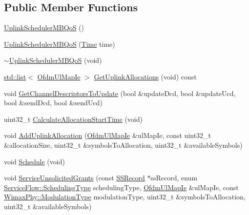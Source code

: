 \subsection*{Public Member Functions}
\begin{DoxyCompactItemize}
\item 
\hyperlink{classns3_1_1UplinkSchedulerMBQoS_aa8db7610198e6bbc698b42b5f580624a}{Uplink\+Scheduler\+M\+B\+QoS} ()
\item 
\hyperlink{classns3_1_1UplinkSchedulerMBQoS_addafca8b699155f0160e45c8f4f5d807}{Uplink\+Scheduler\+M\+B\+QoS} (\hyperlink{classns3_1_1Time}{Time} time)
\item 
\hyperlink{classns3_1_1UplinkSchedulerMBQoS_a859988f74ef9331a784178c7ea538e24}{$\sim$\+Uplink\+Scheduler\+M\+B\+QoS} (void)
\item 
\hyperlink{openflow-interface_8h_afd9bcfa176617760671b67580f536fa7}{std\+::list}$<$ \hyperlink{classns3_1_1OfdmUlMapIe}{Ofdm\+Ul\+Map\+Ie} $>$ \hyperlink{classns3_1_1UplinkSchedulerMBQoS_a09725afc94899e4aacf646abe0ab1f04}{Get\+Uplink\+Allocations} (void) const 
\item 
void \hyperlink{classns3_1_1UplinkSchedulerMBQoS_a623029436fb0c8786de9d5ce1adf5978}{Get\+Channel\+Descriptors\+To\+Update} (bool \&update\+Dcd, bool \&update\+Ucd, bool \&send\+Dcd, bool \&send\+Ucd)
\item 
uint32\+\_\+t \hyperlink{classns3_1_1UplinkSchedulerMBQoS_a3e3b4dc0dd31f8750cee914c18c6cd6e}{Calculate\+Allocation\+Start\+Time} (void)
\item 
void \hyperlink{classns3_1_1UplinkSchedulerMBQoS_a23b74ad65ec3d22b55d25648addd7486}{Add\+Uplink\+Allocation} (\hyperlink{classns3_1_1OfdmUlMapIe}{Ofdm\+Ul\+Map\+Ie} \&ul\+Map\+Ie, const uint32\+\_\+t \&allocation\+Size, uint32\+\_\+t \&symbols\+To\+Allocation, uint32\+\_\+t \&available\+Symbols)
\item 
void \hyperlink{classns3_1_1UplinkSchedulerMBQoS_abd019c4994078b9b6e6c012af5e34ac5}{Schedule} (void)
\item 
void \hyperlink{classns3_1_1UplinkSchedulerMBQoS_a3cbff7d3b7d31739806421f0eb2b1cc6}{Service\+Unsolicited\+Grants} (const \hyperlink{classns3_1_1SSRecord}{S\+S\+Record} $\ast$ss\+Record, enum \hyperlink{classns3_1_1ServiceFlow_a7990ba10be1e098328fd1e6382a26235}{Service\+Flow\+::\+Scheduling\+Type} scheduling\+Type, \hyperlink{classns3_1_1OfdmUlMapIe}{Ofdm\+Ul\+Map\+Ie} \&ul\+Map\+Ie, const \hyperlink{classns3_1_1WimaxPhy_a044c5d8a48ca992c39c2a946f6e755fa}{Wimax\+Phy\+::\+Modulation\+Type} modulation\+Type, uint32\+\_\+t \&symbols\+To\+Allocation, uint32\+\_\+t \&available\+Symbols)

\end{DoxyCompactItemize}
